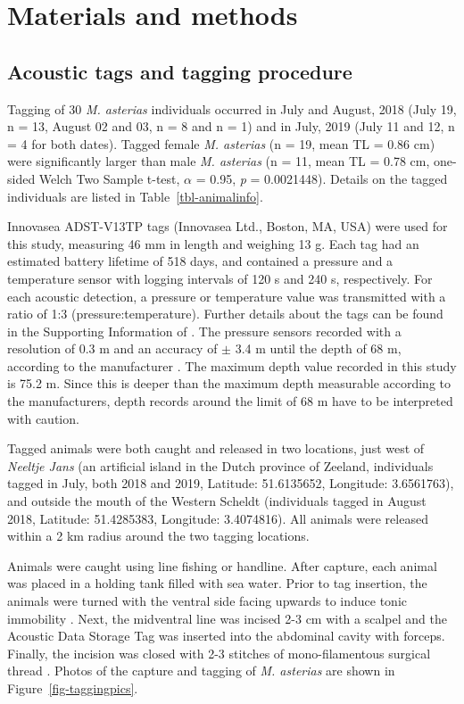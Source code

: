\documentclass[
  authoryear,
  review,
  3p]{elsarticle}
\begin{document}
\hypertarget{sec-mm}{%
\section{Materials and methods}\label{sec-mm}}

\hypertarget{acoustic-tags-and-tagging-procedure}{%
\subsection{Acoustic tags and tagging
procedure}\label{acoustic-tags-and-tagging-procedure}}

Tagging of 30 \emph{M. asterias} individuals occurred in July and
August, 2018 (July 19, n = 13, August 02 and 03, n = 8 and n = 1) and in
July, 2019 (July 11 and 12, n = 4 for both dates). Tagged female
\emph{M. asterias} (n = 19, mean TL = 0.86 cm) were significantly larger
than male \emph{M. asterias} (n = 11, mean TL = 0.78 cm, one-sided Welch
Two Sample t-test, \(\alpha\) = 0.95, \emph{p} = 0.0021448). Details on
the tagged individuals are listed in Table~\ref{tbl-animalinfo}.

Innovasea ADST-V13TP tags (Innovasea Ltd., Boston, MA, USA) were used
for this study, measuring 46 mm in length and weighing 13 g. Each tag
had an estimated battery lifetime of 518 days, and contained a pressure
and a temperature sensor with logging intervals of 120 s and 240 s,
respectively. For each acoustic detection, a pressure or temperature
value was transmitted with a ratio of 1:3 (pressure:temperature).
Further details about the tags can be found in the Supporting
Information of \citet{goossens_2023}. The pressure sensors recorded with
a resolution of 0.3 m and an accuracy of \(\pm\) 3.4 m until the depth
of 68 m, according to the manufacturer \citep{Innovasea_ADST}. The
maximum depth value recorded in this study is 75.2 m. Since this is
deeper than the maximum depth measurable according to the manufacturers,
depth records around the limit of 68 m have to be interpreted with
caution.

Tagged animals were both caught and released in two locations, just west
of \emph{Neeltje Jans} (an artificial island in the Dutch province of
Zeeland, individuals tagged in July, both 2018 and 2019, Latitude:
51.6135652, Longitude: 3.6561763), and outside the mouth of the Western
Scheldt (individuals tagged in August 2018, Latitude: 51.4285383,
Longitude: 3.4074816). All animals were released within a 2 km radius
around the two tagging locations.

Animals were caught using line fishing or handline. After capture, each
animal was placed in a holding tank filled with sea water. Prior to tag
insertion, the animals were turned with the ventral side facing upwards
to induce tonic immobility \citep{kessel_2015}. Next, the midventral
line was incised 2-3 cm with a scalpel and the Acoustic Data Storage Tag
was inserted into the abdominal cavity with forceps. Finally, the
incision was closed with 2-3 stitches of mono-filamentous surgical
thread \citep{goossens_2023}. Photos of the capture and tagging of
\emph{M. asterias} are shown in Figure~\ref{fig-taggingpics}.
\end{document}
